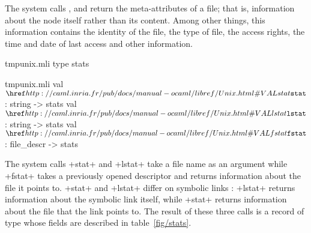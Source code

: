The system calls ,  and 
return the meta-attributes of a file; that is, information about
the node itself rather than its content. Among other things, this
information contains the identity of the file, the type of file, the
access rights, the time and date of last access and other information.
%
\begin{codefile}{tmpunix.mli}
type stats
\end{codefile}
%
\begin{listingcodefile}{tmpunix.mli}
val $\libvalue{Unix}{stat}$  : string -> stats
val $\libvalue{Unix}{lstat}$ : string -> stats
val $\libvalue{Unix}{fstat}$ : file_descr -> stats
\end{listingcodefile}
% 
The system calls \ml+stat+ and \ml+lstat+ take a file name as an
argument while \ml+fstat+ takes a previously opened descriptor and
returns information about the file it points to.  \ml+stat+ and
\ml+lstat+ differ on symbolic links : \ml+lstat+ returns information
about the symbolic link itself, while \ml+stat+ returns information
about the file that the link points to. The result of these three
calls is a record of type  whose fields are
described in table~\ref{fig/stats}.
%
